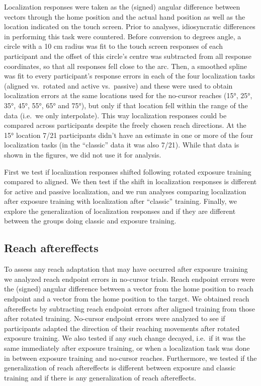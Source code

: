 \documentclass[10pt,letterpaper]{article}
\begin{document}
Localization responses were taken as the (signed) angular difference
between vectors through the home position and the actual hand position
as well as the location indicated on the touch screen. Prior to
analyses, idiosyncratic differences in performing this task were
countered. Before conversion to degrees angle, a circle with a 10 cm
radius was fit to the touch screen responses of each participant and the
offset of this circle's centre was subtracted from all response
coordinates, so that all responses fell close to the arc. Then, a
smoothed spline was fit to every participant's response errors in each
of the four localization tasks (aligned vs.~rotated and active
vs.~passive) and these were used to obtain localization errors at the
same locations used for the no-cursor reaches (15°, 25°, 35°, 45°, 55°,
65° and 75°), but only if that location fell within the range of the
data (i.e.~we only interpolate). This way localization responses could
be compared across participants despite the freely chosen reach
directions. At the 15° location 7/21 participants didn't have an
estimate in one or more of the four localization tasks (in the
``classic'' data it was also 7/21). While that data is shown in the
figures, we did not use it for analysis.

First we test if localization responses shifted following rotated
exposure training compared to aligned. We then test if the shift in
localization responses is different for active and passive localization,
and we run analyses comparing localization after exposure training with
localization after ``classic'' training. Finally, we explore the
generalization of localization responses and if they are different
between the groups doing classic and exposure training.

\subsection{Reach aftereffects}\label{reach-aftereffects}

To assess any reach adaptation that may have occurred after exposure
training we analyzed reach endpoint errors in no-cursor trials. Reach
endpoint errors were the (signed) angular difference between a vector
from the home position to reach endpoint and a vector from the home
position to the target. We obtained reach aftereffects by subtracting
reach endpoint errors after aligned training from those after rotated
training. No-cursor endpoint errors were analyzed to see if participants
adapted the direction of their reaching movements after rotated exposure
training. We also tested if any such change decayed, i.e.~if it was the
same immediately after exposure training, or when a localization task
was done in between exposure training and no-cursor reaches.
Furthermore, we tested if the generalization of reach aftereffects is
different between exposure and classic training and if there is any
generalization of reach aftereffects.
\end{document}
